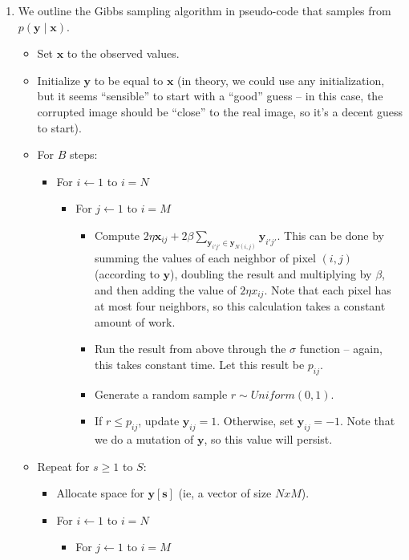 \documentclass[12pt]{article}
\newcommand{\vect}[1]{\boldsymbol{#1}}
\begin{document}
\begin{enumerate}[label=(\alph*)]
\item We outline the Gibbs sampling algorithm in pseudo-code that samples from $p(\vect{y} \mid \vect{x})$.
	\begin{itemize}
		\item Set $\vect{x}$ to the observed values. 
		\item Initialize $\vect{y}$ to be equal to $\vect{x}$ (in theory, we could use any initialization, but it seems ``sensible'' to start with a ``good'' guess -- in this case, the corrupted image should be ``close'' to the real image, so it's a decent guess to start).
		\item For $B$ steps:
			\begin{itemize}
				\item For $i \gets 1$ to $i = N$
				 	\begin{itemize}
				 		\item For $j \gets 1$ to $i = M$
				 			\begin{itemize}
				 				\item Compute $2\eta \vect{x}_{ij} + 2\beta\sum_{\vect{y}_{i'j'} \in \vect{y}_{N(i,j)}} \vect{y}_{i'j'}$. This can be done by summing the values of each neighbor of pixel $(i,j)$ (according to $\vect{y}$), doubling the result and multiplying by $\beta$, and then adding the value of $2\eta x_{ij}$. Note that each pixel has at most four neighbors, so this calculation takes a constant amount of work.
				 				\item Run the result from above through the $\sigma$ function -- again, this takes constant time. Let this result be $p_{ij}$.
				 				\item Generate a random sample $r \sim Uniform(0,1)$.
				 				\item If $r \leq p_{ij}$, update $\vect{y}_{ij} = 1$. Otherwise, set $\vect{y}_{ij} = -1$. Note that we do a mutation of $\vect{y}$, so this value will persist.
				 			\end{itemize}
				 	\end{itemize}
			\end{itemize}
		\item Repeat for $s \geq 1$ to $S$:
			\begin{itemize}
				\item Allocate space for $\vect{y[s]}$ (ie, a vector of size $NxM$).
				\item For $i \gets 1$ to $i = N$
				 	\begin{itemize}
				 		\item For $j \gets 1$ to $i = M$
				 			\begin{itemize}

\end{itemize}
\end{itemize}
\end{itemize}
\end{itemize}
\end{enumerate}
\end{document}
